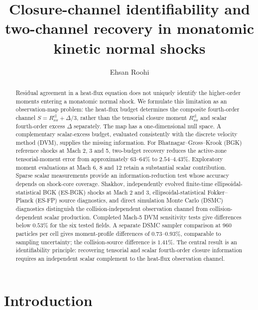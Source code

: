 \documentclass[lineno,paper]{JFM-FLM_Au}
\title{Closure-channel identifiability and two-channel recovery in monatomic kinetic normal shocks}
\author{Ehsan Roohi\aff{1}}
\affiliation{\aff{1}Department of Mechanical and Industrial Engineering, University of Massachusetts Amherst, Amherst, MA 01003, USA}
\newenvironment{revision}{\nolinenumbers\begin{tcolorbox}[breakable,colback=revisionyellow,colframe=revisionyellow,boxrule=0pt,arc=0pt,left=5pt,right=5pt,top=5pt,bottom=5pt,before skip=6pt,after skip=6pt]\captionsetup{width=\linewidth}}{\end{tcolorbox}\linenumbers}
\newenvironment{revision}{}{}
\newcommand{\cl}{\mathrm{cl}}
\begin{document}
\maketitle
\raggedbottom
\setlength{\abovedisplayskip}{7pt}
\setlength{\belowdisplayskip}{7pt}
\setlength{\abovedisplayshortskip}{4pt}
\setlength{\belowdisplayshortskip}{4pt}


\begin{abstract}
\begin{revision}
Residual agreement in a heat-flux equation does not uniquely identify the higher-order moments entering a monatomic normal shock. We formulate this limitation as an observation-map problem: the heat-flux budget determines the composite fourth-order channel $S=R^{\cl}_{xx}+\Delta/3$, rather than the tensorial closure moment $R^{\cl}_{xx}$ and scalar fourth-order excess $\Delta$ separately. The map has a one-dimensional null space. A complementary scalar-excess budget, evaluated consistently with the discrete velocity method (DVM), supplies the missing information. For Bhatnagar--Gross--Krook (BGK) reference shocks at Mach 2, 3 and 5, two-budget recovery reduces the active-zone tensorial-moment error from approximately $63$--$64\%$ to $2.54$--$4.43\%$. Exploratory moment evaluations at Mach 6, 8 and 12 retain a substantial scalar contribution. Sparse scalar measurements provide an information-reduction test whose accuracy depends on shock-core coverage. Shakhov, independently evolved finite-time ellipsoidal-statistical BGK (ES-BGK) shocks at Mach 2 and 3, ellipsoidal-statistical Fokker--Planck (ES-FP) source diagnostics, and direct simulation Monte Carlo (DSMC) diagnostics distinguish the collision-independent observation channel from collision-dependent scalar production. Completed Mach-5 DVM sensitivity tests give differences below $0.53\%$ for the six tested fields. A separate DSMC sampler comparison at 960 particles per cell gives moment-profile differences of $0.73$--$0.93\%$, comparable to sampling uncertainty; the collision-source difference is $1.41\%$. The central result is an identifiability principle: recovering tensorial and scalar fourth-order closure information requires an independent scalar complement to the heat-flux observation channel.
\end{revision}
\end{abstract}

\section{Introduction}
\label{sec:introduction}
\end{document}
